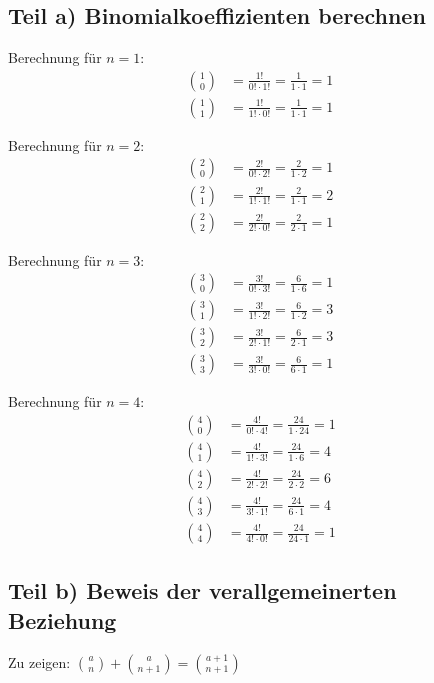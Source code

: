 \documentclass{article}
\begin{document}
\subsection*{Teil a) Binomialkoeffizienten berechnen}

Berechnung für $n = 1$:
\begin{align}
\binom{1}{0} &= \frac{1!}{0! \cdot 1!} = \frac{1}{1 \cdot 1} = 1 \\
\binom{1}{1} &= \frac{1!}{1! \cdot 0!} = \frac{1}{1 \cdot 1} = 1
\end{align}

Berechnung für $n = 2$:
\begin{align}
\binom{2}{0} &= \frac{2!}{0! \cdot 2!} = \frac{2}{1 \cdot 2} = 1 \\
\binom{2}{1} &= \frac{2!}{1! \cdot 1!} = \frac{2}{1 \cdot 1} = 2 \\
\binom{2}{2} &= \frac{2!}{2! \cdot 0!} = \frac{2}{2 \cdot 1} = 1
\end{align}

Berechnung für $n = 3$:
\begin{align}
\binom{3}{0} &= \frac{3!}{0! \cdot 3!} = \frac{6}{1 \cdot 6} = 1 \\
\binom{3}{1} &= \frac{3!}{1! \cdot 2!} = \frac{6}{1 \cdot 2} = 3 \\
\binom{3}{2} &= \frac{3!}{2! \cdot 1!} = \frac{6}{2 \cdot 1} = 3 \\
\binom{3}{3} &= \frac{3!}{3! \cdot 0!} = \frac{6}{6 \cdot 1} = 1
\end{align}

Berechnung für $n = 4$:
\begin{align}
\binom{4}{0} &= \frac{4!}{0! \cdot 4!} = \frac{24}{1 \cdot 24} = 1 \\
\binom{4}{1} &= \frac{4!}{1! \cdot 3!} = \frac{24}{1 \cdot 6} = 4 \\
\binom{4}{2} &= \frac{4!}{2! \cdot 2!} = \frac{24}{2 \cdot 2} = 6 \\
\binom{4}{3} &= \frac{4!}{3! \cdot 1!} = \frac{24}{6 \cdot 1} = 4 \\
\binom{4}{4} &= \frac{4!}{4! \cdot 0!} = \frac{24}{24 \cdot 1} = 1
\end{align}

\subsection*{Teil b) Beweis der verallgemeinerten Beziehung}

Zu zeigen: $\binom{a}{n} + \binom{a}{n + 1} = \binom{a + 1}{n + 1}$
\end{document}
